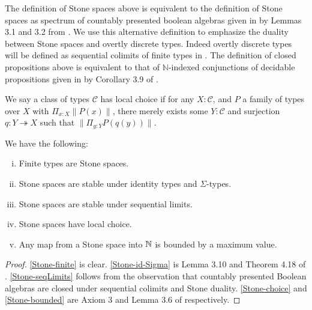 \begin{remark}
  The definition of Stone spaces above is equivalent to the definition of Stone spaces as spectrum of countably presented boolean algebras given in \cite{synthetic-stone-duality} by Lemmas 3.1 and 3.2 from \cite{synthetic-stone-duality}. We use this alternative definition to emphasize the duality between Stone spaces and overtly discrete types. Indeed overtly discrete types will be defined as sequential colimits of finite types in .
%
  The definition of closed propositions above is equivalent to that of $\mathbb N$-indexed conjunctions of decidable propositions given in \cite{synthetic-stone-duality} by Corollary 3.9 of \cite{synthetic-stone-duality}. 
\end{remark}

\begin{definition}
  We say a class of types $\mathcal C$ has local choice if for any $X:\mathcal C$, and $P$ a family of types over $X$ with $\Pi_{x:X} \| P(x)\| $, there merely exists some $Y:\mathcal C$ and surjection $q: Y \twoheadrightarrow X $ such that $\| \Pi_{y:Y} P (q(y))\|$. 
\end{definition}

\begin{proposition}\label{Stone-closure}
We have the following:

\begin{enumerate}[(i)]
  \item\label{Stone-finite} Finite types are Stone spaces.
  \item\label{Stone-id-Sigma} Stone spaces are stable under identity types and $\Sigma$-types.
  \item\label{Stone-seqLimits} Stone spaces are stable under sequential limits.
  \item\label{Stone-choice} Stone spaces have local choice.
  \item\label{Stone-bounded} Any map from a Stone space into $\mathbb{N}$ is bounded by a maximum value.
\end{enumerate}
\end{proposition}

\begin{proof}
  \ref{Stone-finite} is clear. \ref{Stone-id-Sigma} is Lemma 3.10 and Theorem 4.18 of \cite{synthetic-stone-duality}. \ref{Stone-seqLimits} follows from the observation that countably presented Boolean algebras are closed under sequential colimits and Stone duality. \ref{Stone-choice} and \ref{Stone-bounded} are Axiom 3 and Lemma 3.6 of \cite{synthetic-stone-duality} respectively. 
\end{proof}

